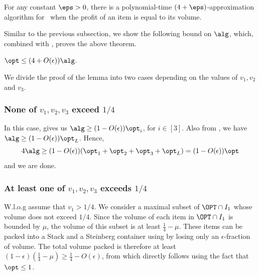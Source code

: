 \begin{theorem}
    \label{thm:3dkp}
   For any constant $\eps>0$, there is a polynomial-time $(4 +\eps)$-approximation algorithm for \tdk~when the profit of an item is equal to its volume. 
\end{theorem}

Similar to the previous subsection, we show the following bound on $\alg$, which, combined with , proves the above theorem.

\begin{lemma}
\label{lem:3dkvolume}
    $\opt \le (4+O(\epsilon))\alg$.
\end{lemma}

We divide the proof of the lemma into two cases depending on the values of $v_1, v_2$ and $v_3$.

\subsubsection{None of \texorpdfstring{$v_1,v_2,v_3$}{v1, v2, v3} exceed \texorpdfstring{$1/4$}{1/4}}
In this case,  gives us $\alg \ge (1-O(\epsilon))\opt_i$, for $i\in [3]$. Also from , we have $\alg \ge (1-O(\epsilon))\opt_L$. Hence,
\[ 4\alg \ge (1-O(\epsilon))(\opt_1 + \opt_2 + \opt_3 + \opt_L) = (1-O(\epsilon))\opt\]
and we are done.

\subsubsection{At least one of \texorpdfstring{$v_1,v_2,v_3$}{v1, v2, v3} exceeds \texorpdfstring{$1/4$}{1/4}}
W.l.o.g assume that $v_1 > 1/4$. We consider a maximal subset of $\OPT\cap I_1$ whose volume does not exceed $1/4$. Since the volume of each item in $\OPT\cap I_1$ is bounded by $\mu$, the volume of this subset is at least $\frac{1}{4}-\mu$. These items can be packed into a Stack and a Steinberg container using  by losing only an $\epsilon$-fraction of volume. The total volume packed is therefore at least $(1-\epsilon)\left(\frac{1}{4}-\mu\right) \ge \frac{1}{4}-O(\epsilon)$, from which  directly follows using the fact that $\opt\le 1$.  
















